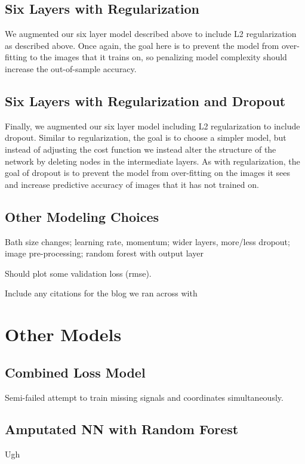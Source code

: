 \documentclass[journal]{IEEEtran}
\begin{document}
\subsection{Six Layers with Regularization}

We augmented our six layer model described above to include L2 regularization as described above. Once again, the goal here is to prevent the model from over-fitting to the images that it trains on, so penalizing model complexity should increase the out-of-sample accuracy.

\subsection{Six Layers with Regularization and Dropout}

Finally, we augmented our six layer model including L2 regularization to include dropout. Similar to regularization, the goal is to choose a simpler model, but instead of adjusting the cost function we instead alter the structure of the network by deleting nodes in the intermediate layers. As with regularization, the goal of dropout is to prevent the model from over-fitting on the images it sees and increase predictive accuracy of images that it has not trained on.

\subsection{Other Modeling Choices}

Bath size changes; learning rate, momentum; wider layers, more/less dropout; image pre-processing; random forest with output layer



Should plot some validation loss (rmse).

Include any citations for the blog we ran across with \cite{dnouri}

\section{Other Models}

\subsection{Combined Loss Model}
Semi-failed attempt to train missing signals and coordinates simultaneously.

\subsection{Amputated NN with Random Forest}
Ugh
\end{document}
